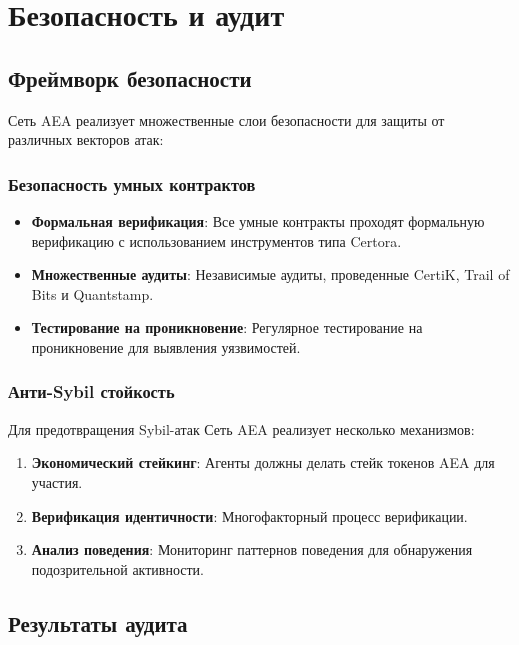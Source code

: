 \documentclass[12pt,a4paper]{article}
\begin{document}
\section{Безопасность и аудит}

\subsection{Фреймворк безопасности}

Сеть AEA реализует множественные слои безопасности для защиты от различных векторов атак:

\subsubsection{Безопасность умных контрактов}

\begin{itemize}
\item \textbf{Формальная верификация}: Все умные контракты проходят формальную верификацию с использованием инструментов типа Certora.
\item \textbf{Множественные аудиты}: Независимые аудиты, проведенные CertiK, Trail of Bits и Quantstamp.
\item \textbf{Тестирование на проникновение}: Регулярное тестирование на проникновение для выявления уязвимостей.
\end{itemize}

\subsubsection{Анти-Sybil стойкость}

Для предотвращения Sybil-атак Сеть AEA реализует несколько механизмов:

\begin{enumerate}
\item \textbf{Экономический стейкинг}: Агенты должны делать стейк токенов AEA для участия.
\item \textbf{Верификация идентичности}: Многофакторный процесс верификации.
\item \textbf{Анализ поведения}: Мониторинг паттернов поведения для обнаружения подозрительной активности.
\end{enumerate}

\subsection{Результаты аудита}
\end{document}
